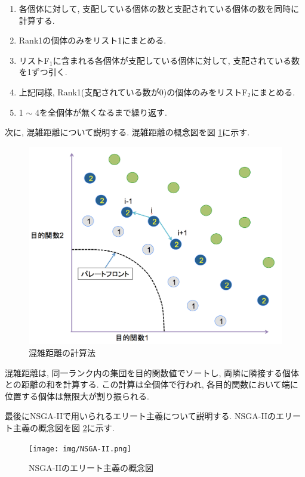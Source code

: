 \documentclass[12pt,a4j,notitlepage]{jreport}
\begin{document}
\begin{enumerate}
\item 各個体に対して, 支配している個体の数と支配されている個体の数を同時に計算する.
\item Rank1の個体のみをリスト1にまとめる.
\item リストF$_1$に含まれる各個体が支配している個体に対して, 支配されている数を1ずつ引く.
\item 上記同様, Rank1(支配されている数が0)の個体のみをリストF$_2$にまとめる.
\item 1 $\sim$ 4を全個体が無くなるまで繰り返す.
\end{enumerate}

次に, 混雑距離について説明する.
混雑距離の概念図を図 \ref{fig:crowd}に示す.
\begin{figure}[htbp]
	\begin{center}
		\includegraphics[width=0.7\linewidth]{img/Crowd.png}
             		\setlength{\abovecaptionskip}{0mm}
		\setlength{\belowcaptionskip}{0mm}
			\caption{混雑距離の計算法}
	\label{fig:crowd}
	\end{center}
\end{figure}

混雑距離は, 同一ランク内の集団を目的関数値でソートし, 両隣に隣接する個体との距離の和を計算する.
この計算は全個体で行われ, 各目的関数において端に位置する個体は無限大が割り振られる.

最後にNSGA-IIで用いられるエリート主義について説明する.
NSGA-IIのエリート主義の概念図を図 \ref{fig:nsgaii}に示す.
\begin{figure}[htbp]
	\begin{center}
		\texttt{[image: img/NSGA-II.png]}
             		\setlength{\abovecaptionskip}{0mm}
		\setlength{\belowcaptionskip}{0mm}
			\caption{NSGA-IIのエリート主義の概念図}
	\label{fig:nsgaii}
	\end{center}
\end{figure}
\end{document}
